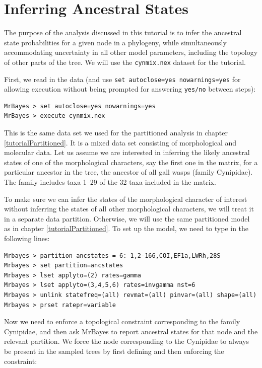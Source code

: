 \documentclass[12pt]{book}
\begin{document}
\section{Inferring Ancestral States}

The purpose of the analysis discussed in this tutorial is to infer the ancestral state
probabilities for a given node in a phylogeny, while simultaneously accommodating uncertainty in
all other model parameters, including the topology of other parts of the tree. We will use the
\texttt{cynmix.nex} dataset for the tutorial.

First, we read in the data (and use \texttt{set autoclose=yes nowarnings=yes} for allowing
execution without being prompted for answering \texttt{yes/no} between steps):

\begin{Verbatim}
MrBayes > set autoclose=yes nowarnings=yes
MrBayes > execute cynmix.nex
\end{Verbatim}

This is the same data set we used for the partitioned analysis in chapter
\ref{tutorialPartitioned}. It is a mixed data set consisting of morphological and molecular data.
Let us assume we are interested in inferring the likely ancestral states of one of the
morphological characters, say the first one in the matrix, for a particular ancestor in the tree,
the ancestor of all gall wasps (family Cynipidae). The family includes taxa 1--29 of the 32 taxa
included in the matrix.

To make sure we can infer the states of the morphological character of interest without inferring
the states of all other morphological characters, we will treat it in a separate data partition.
Otherwise, we will use the same partitioned model as in chapter \ref{tutorialPartitioned}. To set
up the model, we need to type in the following lines:

\begin{Verbatim}
Mrbayes > partition ancstates = 6: 1,2-166,COI,EF1a,LWRh,28S
Mrbayes > set partition=ancstates
Mrbayes > lset applyto=(2) rates=gamma
Mrbayes > lset applyto=(3,4,5,6) rates=invgamma nst=6
Mrbayes > unlink statefreq=(all) revmat=(all) pinvar=(all) shape=(all)
Mrbayes > prset ratepr=variable
\end{Verbatim}

Now we need to enforce a topological constraint corresponding to the family Cynipidae, and then ask
MrBayes to report ancestral states for that node and the relevant partition. We force the node
corresponding to the Cynipidae to always be present in the sampled trees by first defining and then
enforcing the constraint:
\end{document}
